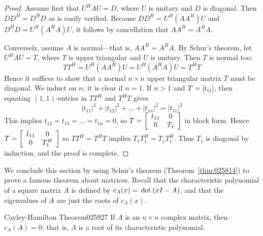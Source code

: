 \begin{proof}
Assume first that $U^{H}AU = D$, where $U$ is unitary and $D$ is diagonal. Then $DD^{H} = D^{H}D$ as is easily verified. Because $DD^{H} = U^{H}(AA^{H})U$ and $D^{H}D = U^{H}(A^{H}A)U$, it follows by cancellation that $AA^{H} = A^{H}A$.


Conversely, assume $A$ is normal---that is, $AA^{H} = A^{H}A$. By Schur's theorem, let $U^{H}AU = T$, where $T$ is upper triangular and $U$ is unitary. Then $T$ is normal too:
\begin{equation*}
TT^H = U^H(AA^H)U = U^H(A^HA)U = T^HT
\end{equation*}
Hence it suffices to show that a normal $n \times n$ upper triangular matrix $T$ must be diagonal. We induct on $n$; it is clear if $n = 1$. If $n > 1$ and $T = \left[ t_{ij} \right]$, then equating $(1, 1)$-entries in $TT^{H}$ and $T^{H}T$ gives
\begin{equation*}
|t_{11}|^2 + |t_{12}|^2 + \dots + |t_{1n}|^2 = |t_{11}|^2
\end{equation*}
This implies $t_{12} = t_{13} = \dots = t_{1n} = 0$, so $T = \left[ \begin{array}{cc}
t_{11} & 0 \\
0 & T_{1}
\end{array}\right]$ in block form. Hence $T = \left[ \begin{array}{cc}
\overline{t}_{11} & 0 \\
0 & T_{1}^H
\end{array}\right]$ so $TT^{H} = T^{H}T$ implies $T_{1}T_{1}^H = T_{1}T_{1}^H$. Thus $T_{1}$ is diagonal by induction, and the proof is complete.
\end{proof}

We conclude this section by using Schur's theorem (Theorem~\ref{thm:025814}) to prove a famous theorem about matrices. Recall that the characteristic polynomial of a square matrix $A$ is defined by $c_{A}(x) = \thinspace\operatorname{det\medspace}(xI - A)$, and that the eigenvalues of $A$ are just the roots of $c_{A}(x)$.


\begin{theorem}{Cayley-Hamilton Theorem\footnotemark}{025927}
If $A$ is an $n \times n$ complex matrix, then $c_{A}(A) = 0$; that is, $A$ is a root of its characteristic polynomial.
\end{theorem}

